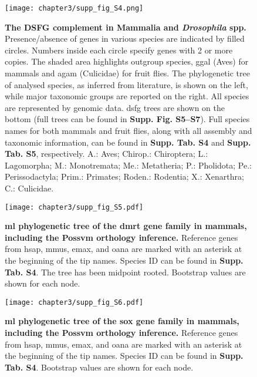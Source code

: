 \documentclass[../main.tex]{subfiles}
\begin{document}
\begin{figure}[ht]
	\centering
	\texttt{[image: chapter3/supp\_fig\_S4.png]}
	\captionsetup{width=\textwidth}
	\caption{
		\textbf{The DSFG complement in Mammalia and \textit{Drosophila} spp.} Presence/absence of genes in various species are indicated by filled circles. Numbers inside each circle specify genes with 2 or more copies. The shaded area highlights outgroup species, \gls{ggal} (Aves) for mammals and \gls{agam} (Culicidae) for fruit flies. The phylogenetic tree of analysed species, as inferred from literature, is shown on the left, while major taxonomic groups are reported on the right. All species are represented by genomic data. \gls{dsfg} trees are shown on the bottom (full trees can be found in \textbf{Supp. Fig. S5--S7}). Full species names for both mammals and fruit flies, along with all assembly and taxonomic information, can be found in \textbf{Supp. Tab. S4} and \textbf{Supp. Tab. S5}, respectively. A.: Aves; Chirop.: Chiroptera; L.: Lagomorpha; M.: Monotremata; Me.: Metatheria; P.: Pholidota; Pe.: Perissodactyla; Prim.: Primates; Roden.: Rodentia; X.: Xenarthra; C.: Culicidae.
	}
	\label{suppFig:DSFG_testCompilation}
\end{figure}

\begin{figure}[ht]
	\centering
	\texttt{[image: chapter3/supp\_fig\_S5.pdf]}
	\captionsetup{width=\textwidth}
	\caption{
		\textbf{\gls{ml} phylogenetic tree of the \gls{dmrt} gene family in mammals, including the Possvm orthology inference.} Reference genes from \gls{hsap}, \gls{mmus}, \gls{emax}, and \gls{oana} are marked with an asterisk at the beginning of the tip names. Species ID can be found in \textbf{Supp. Tab. S4}. The tree has been midpoint rooted. Bootstrap values are shown for each node.
	}
	\label{suppFig:dmrt_mammals}
\end{figure}

\begin{figure}[ht]
	\centering
	\texttt{[image: chapter3/supp\_fig\_S6.pdf]}
	\captionsetup{width=\textwidth}
	\caption{
		\textbf{\gls{ml} phylogenetic tree of the \gls{sox} gene family in mammals, including the Possvm orthology inference.} Reference genes from \gls{hsap}, \gls{mmus}, \gls{emax}, and \gls{oana} are marked with an asterisk at the beginning of the tip names. Species ID can be found in \textbf{Supp. Tab. S4}. Bootstrap values are shown for each node.
	}
	\label{suppFig:sox_mammals}
\end{figure}
\end{document}
